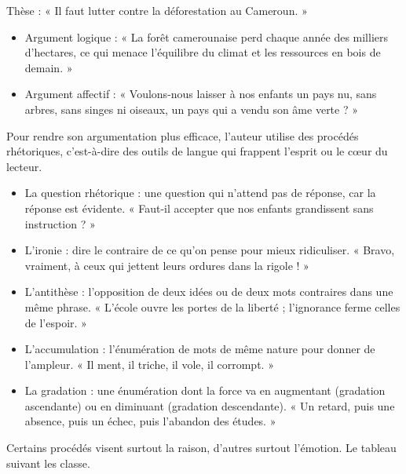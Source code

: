 \documentclass[11pt]{article}
\newcommand{\cle}[1]{{\popxbold\color{popdark}#1}}
\newcounter{popsec}
\newcounter{popsub}
\newcommand{\courssub}[1]{%
  \stepcounter{popsub}%
  \par\vspace{9pt}\noindent{\popxbold\fontsize{11.5}{13}\selectfont\color{popink}{\color{poporange}\thepopsec.\thepopsub}\hspace{6pt}#1}\par\nopagebreak\vspace{4pt}
}
\begin{document}
\begin{exemplebox}
Thèse : « Il faut lutter contre la déforestation au Cameroun. »
\begin{itemize}
\item Argument logique : « La forêt camerounaise perd chaque année des milliers d'hectares, ce qui menace l'équilibre du climat et les ressources en bois de demain. »
\item Argument affectif : « Voulons-nous laisser à nos enfants un pays nu, sans arbres, sans singes ni oiseaux, un pays qui a vendu son âme verte ? »
\end{itemize}
\end{exemplebox}

\courssub{Les procédés rhétoriques}

Pour rendre son argumentation plus efficace, l'auteur utilise des \cle{procédés rhétoriques}, c'est-à-dire des outils de langue qui frappent l'esprit ou le cœur du lecteur.

\begin{definition}
\begin{itemize}
\item La \cle{question rhétorique} : une question qui n'attend pas de réponse, car la réponse est évidente. « Faut-il accepter que nos enfants grandissent sans instruction ? »
\item L'\cle{ironie} : dire le contraire de ce qu'on pense pour mieux ridiculiser. « Bravo, vraiment, à ceux qui jettent leurs ordures dans la rigole ! »
\item L'\cle{antithèse} : l'opposition de deux idées ou de deux mots contraires dans une même phrase. « L'école ouvre les portes de la liberté ; l'ignorance ferme celles de l'espoir. »
\item L'\cle{accumulation} : l'énumération de mots de même nature pour donner de l'ampleur. « Il ment, il triche, il vole, il corrompt. »
\item La \cle{gradation} : une énumération dont la force va en augmentant (gradation ascendante) ou en diminuant (gradation descendante). « Un retard, puis une absence, puis un échec, puis l'abandon des études. »
\end{itemize}
\end{definition}

Certains procédés visent surtout la raison, d'autres surtout l'émotion. Le tableau suivant les classe.
\end{document}
